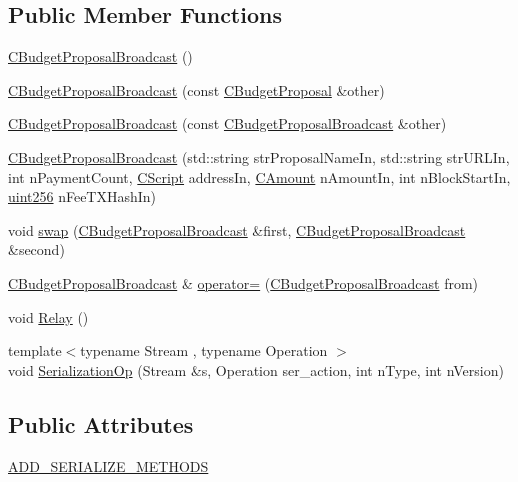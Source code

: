 \subsection*{Public Member Functions}
\begin{DoxyCompactItemize}
\item 
\hyperlink{class_c_budget_proposal_broadcast_a276f93646b7597ba602b58779ec774d7}{C\+Budget\+Proposal\+Broadcast} ()
\item 
\hyperlink{class_c_budget_proposal_broadcast_a1990e16be65f91b9fe8ddecbf368f108}{C\+Budget\+Proposal\+Broadcast} (const \hyperlink{class_c_budget_proposal}{C\+Budget\+Proposal} \&other)
\item 
\hyperlink{class_c_budget_proposal_broadcast_abdebe74d19e013273ead62e83a62d962}{C\+Budget\+Proposal\+Broadcast} (const \hyperlink{class_c_budget_proposal_broadcast}{C\+Budget\+Proposal\+Broadcast} \&other)
\item 
\hyperlink{class_c_budget_proposal_broadcast_ab730123d69f4481b88af666914c2da98}{C\+Budget\+Proposal\+Broadcast} (std\+::string str\+Proposal\+Name\+In, std\+::string str\+U\+R\+L\+In, int n\+Payment\+Count, \hyperlink{class_c_script}{C\+Script} address\+In, \hyperlink{amount_8h_a4eaf3a5239714d8c45b851527f7cb564}{C\+Amount} n\+Amount\+In, int n\+Block\+Start\+In, \hyperlink{classuint256}{uint256} n\+Fee\+T\+X\+Hash\+In)
\item 
void \hyperlink{class_c_budget_proposal_broadcast_af4fd5d1ded64319b83b78e6957e8c8f0}{swap} (\hyperlink{class_c_budget_proposal_broadcast}{C\+Budget\+Proposal\+Broadcast} \&first, \hyperlink{class_c_budget_proposal_broadcast}{C\+Budget\+Proposal\+Broadcast} \&second)
\item 
\hyperlink{class_c_budget_proposal_broadcast}{C\+Budget\+Proposal\+Broadcast} \& \hyperlink{class_c_budget_proposal_broadcast_a068fb44d8f0dce19c2fddad8e0b04e01}{operator=} (\hyperlink{class_c_budget_proposal_broadcast}{C\+Budget\+Proposal\+Broadcast} from)
\item 
void \hyperlink{class_c_budget_proposal_broadcast_a7a791236cedfc5beb5fefa438d5626fb}{Relay} ()
\item 
{\footnotesize template$<$typename Stream , typename Operation $>$ }\\void \hyperlink{class_c_budget_proposal_broadcast_ab0c507f96fb17fd51eb874f7532ae887}{Serialization\+Op} (Stream \&s, Operation ser\+\_\+action, int n\+Type, int n\+Version)
\end{DoxyCompactItemize}
\subsection*{Public Attributes}
\begin{DoxyCompactItemize}
\item 
\hyperlink{class_c_budget_proposal_broadcast_ad5372e24fcfa7ba233702140908fd0f6}{A\+D\+D\+\_\+\+S\+E\+R\+I\+A\+L\+I\+Z\+E\+\_\+\+M\+E\+T\+H\+O\+D\+S}
\end{DoxyCompactItemize}


